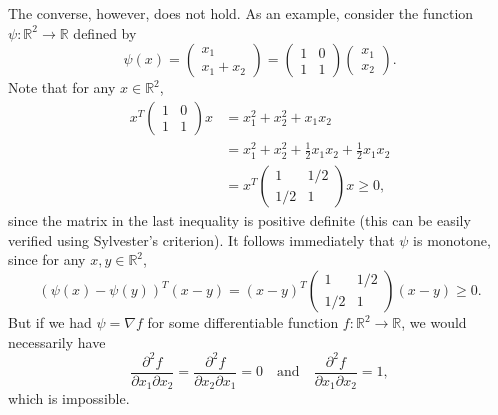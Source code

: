 \documentclass[letterpaper,12pt]{article}
\begin{document}
\begin{enumerate}
  \bigskip

  The converse, however, does not hold. As an example, consider the
  function $\psi : \mathbb{R}^2 \to \mathbb{R}$ defined by
  \begin{equation*}
    \psi(x)
      = \begin{pmatrix}
        x_1 \\
        x_1 + x_2
      \end{pmatrix}
      = \begin{pmatrix}
        1 & 0 \\
        1 & 1
      \end{pmatrix}
      \begin{pmatrix}
        x_1 \\
        x_2
      \end{pmatrix}.
  \end{equation*}
  Note that for any $x \in \mathbb{R}^2$,
  \begin{align*}
    x^T
    \begin{pmatrix}
      1 & 0 \\
      1 & 1
    \end{pmatrix}
    x
    &= x_1^2 + x_2^2 + x_1 x_2 \\
    &= x_1^2 + x_2^2 + \frac{1}{2} x_1 x_2 + \frac{1}{2} x_1 x_2 \\
    &= x^T
    \begin{pmatrix}
      1 & 1/2 \\
      1/2 & 1
    \end{pmatrix}
    x \geq 0,
  \end{align*}
  since the matrix in the last inequality is positive definite (this
  can be easily verified using Sylvester's criterion). It follows
  immediately that $\psi$ is monotone, since for any
  $x, y \in \mathbb{R}^2$,
  \begin{equation*}
    (\psi(x) - \psi(y))^T (x - y)
    = (x - y)^T
    \begin{pmatrix}
      1 & 1/2 \\
      1/2 & 1
    \end{pmatrix}
    (x - y) \geq 0.
  \end{equation*}
  But if we had $\psi = \nabla f$ for some differentiable function
  $f : \mathbb{R}^2 \to \mathbb{R}$, we would necessarily have
  \begin{equation*}
    \frac{\partial^2 f}{\partial x_1 \partial x_2}
      = \frac{\partial^2 f}{\partial x_2 \partial x_1} = 0
    \quad \text{and} \quad
    \frac{\partial^2 f}{\partial x_1 \partial x_2} = 1,
  \end{equation*}
  which is impossible.


\end{enumerate}
\end{document}
